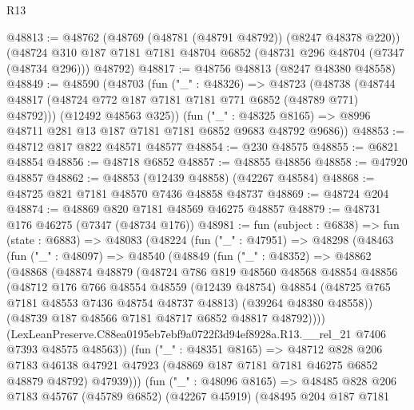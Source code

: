 \begin{lexlean}{R13}
\begin{coremodule}
@48813 := @48762
    (@48769 (@48781 (@48791 @48792)) (@8247 @48378 @220))
    (@48724 @310 @187 @7181 @7181 @48704 @6852 (@48731 @296 @48704 (@7347 (@48734 @296))) @48792)
@48817 := @48756 @48813 (@8247 @48380 @48558)
@48849 := @48590
    (@48703
      (fun ("_" : @48326) =>
      @48723
        (@48738 (@48744 @48817 (@48724 @772 @187 @7181 @7181 @771 @6852 (@48789 @771) @48792)))
        (@12492 @48563 @325))
      (fun ("_" : @48325 @8165) => @8996 @48711 @281 @13 @187 @7181 @7181 @6852 @9683 @48792 @9686))
@48853 := @48712 @817 @822 @48571 @48577
@48854 := @230 @48575
@48855 := @6821 @48854
@48856 := @48718 @6852
@48857 := @48855 @48856
@48858 := @47920 @48857
@48862 := @48853 (@12439 @48858) (@42267 @48584)
@48868 := @48725 @821 @7181 @48570 @7436 @48858 @48737
@48869 := @48724 @204
@48874 := @48869 @820 @7181 @48569 @46275 @48857
@48879 := @48731 @176 @46275 (@7347 (@48734 @176))
@48981 := fun (subject : @6838) =>
  fun (state : @6883) =>
  @48083
    (@48224
      (fun ("_" : @47951) =>
      @48298
        (@48463
          (fun ("_" : @48097) =>
          @48540
            (@48849
              (fun ("_" : @48352) =>
              @48862
                (@48868
                  (@48874
                    @48879
                    (@48724
                      @786
                      @819
                      @48560
                      @48568
                      @48854
                      @48856
                      (@48712
                        @176
                        @766
                        @48554
                        @48559
                        (@12439 @48754)
                        @48854
                        (@48725 @765 @7181 @48553 @7436 @48754 @48737 @48813)
                        (@39264 @48380 @48558))
                      (@48739 @187 @48566 @7181 @48717 @6852 @48817 @48792))))
                (LexLeanPreserve.C88ea0195eb7ebf9a0722f3d94ef8928a.R13.__rel_21
                  @7406
                  @7393
                  @48575
                  @48563))
              (fun ("_" : @48351 @8165) =>
              @48712
                @828
                @206
                @7183
                @46138
                @47921
                @47923
                (@48869 @187 @7181 @7181 @46275 @6852 @48879 @48792)
                @47939)))
          (fun ("_" : @48096 @8165) =>
          @48485
            @828
            @206
            @7183
            @45767
            (@45789 @6852)
            (@42267 @45919)
            (@48495
              @204
              @187
              @7181

\end{coremodule}
\end{lexlean}

